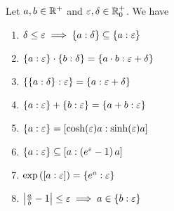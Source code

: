 \begin{theorem} \label{thm:multiplicative:rules}
  Let $a,b\in \Rplus$ and $\epsilon,\delta \in\Rplusnull$. We have

  \begin{enumerate}
    \item $\delta \le \epsilon \implies \ean[\delta]{a} \subseteq \ean[\epsilon]{a}$ 
    \item $\ean[\epsilon]{a} \cdot \ean[\delta]{b} = \ean[\epsilon+\delta]{a\cdot b}$
    \item $\ean[\epsilon]{\ean[\delta]{a}} = \ean[\epsilon+\delta]{a}$
    \item $\ean[\epsilon]{a} + \ean[\epsilon]{b} = \ean[\epsilon]{a+b}$
    \item $\ean[\epsilon]{a} = \an[\sinh(\epsilon)a]{\cosh(\epsilon)a}$
    \item $\ean[\epsilon]{a} \subseteq \an[\left(e^\epsilon-1\right)a]{a}$
    \item $\exp\left(\an[\epsilon]{a}\right) = \ean[\epsilon]{e^a}$
    \item $\abs{\frac ab-1} \le \epsilon \implies a\in\ean[\epsilon]{b}$
  \end{enumerate}
\end{theorem}
